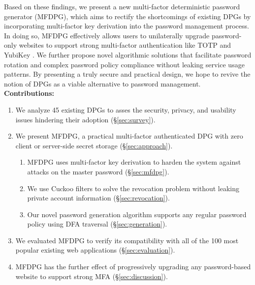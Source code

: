 Based on these findings, we present a new multi-factor deterministic password generator (MFDPG), which aims to rectify the shortcomings of existing DPGs by incorporating multi-factor key derivation \cite{mfkdf} into the password management process. In doing so, MFDPG effectively allows users to unilaterally upgrade password-only websites to support strong multi-factor authentication like TOTP \cite{rfc6238} and YubiKey \cite{yubikey}.
We further propose novel algorithmic solutions that facilitate password rotation and complex password policy compliance without leaking service usage patterns.
By presenting a truly secure and practical design, we hope to revive the notion of DPGs as a viable alternative to password management. \\

\noindent \textbf{Contributions:}
\vspace{-0.5em}
\begin{enumerate}[leftmargin=*]
    \item We analyze 45 existing DPGs to asses the security, privacy, and usability issues hindering their adoption (\S\ref{sec:survey}).
    \item We present MFDPG, a practical multi-factor authenticated DPG with zero client or server-side secret storage (\S\ref{sec:approach}).
    \begin{enumerate}
        \item MFDPG uses multi-factor key derivation to harden the system against attacks on the master password (\S\ref{sec:mfdpg}).
        \item We use Cuckoo filters to solve the revocation problem without leaking private account information (\S\ref{sec:revocation}).
        \item Our novel password generation algorithm supports any regular password policy using DFA traversal (\S\ref{sec:generation}).
    \end{enumerate}
    \item We evaluated MFDPG to verify its compatibility with all of the 100 most popular existing web applications (\S\ref{sec:evaluation}).
    \item MFDPG has the further effect of progressively upgrading any password-based website to support strong MFA (\S\ref{sec:discussion}).
\end{enumerate}

\eject